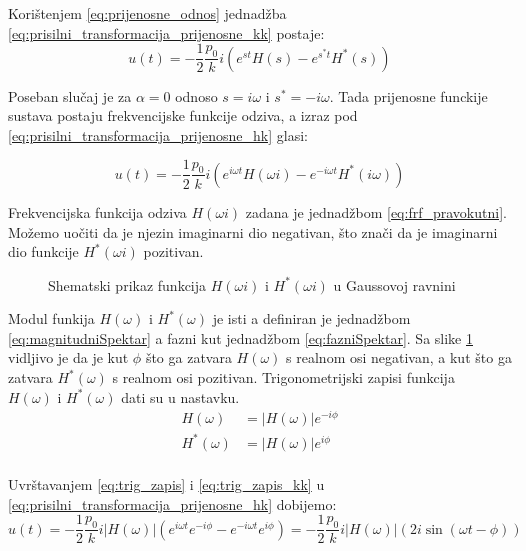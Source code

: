 Korištenjem \eqref{eq:prijenosne_odnos} jednadžba \eqref{eq:prisilni_transformacija_prijenosne_kk}
postaje:
\begin{equation}\label{eq:prisilni_transformacija_prijenosne_hk}
    u(t)=-\frac{1}{2}\frac{p_0}{k}i (e^{st}H(s)-e^{s^*t}H^*(s))
\end{equation}

Poseban slučaj je za $\alpha = 0$ odnoso $s=i\omega \text{ i } s^*=-i\omega$. Tada
prijenosne funckije sustava postaju frekvencijske funkcije odziva, a izraz pod
\eqref{eq:prisilni_transformacija_prijenosne_hk} glasi:

\begin{equation}\label{eq:prisilni_transformacija_frf}
    u(t) = -\frac{1}{2}\frac{p_0}{k}i(e^{i\omega t}H(\omega i) - e^{-i\omega t}H^*(i\omega))
\end{equation}

Frekvencijska funkcija odziva $H(\omega i)$ zadana je jednadžbom \eqref{eq:frf_pravokutni}.
Možemo uočiti da je njezin imaginarni dio negativan, što znači da je imaginarni dio
funkcije $H^*(\omega i)$ pozitivan.
\begin{figure}[H]
    
    \caption{Shematski prikaz funkcija $H(\omega i) \text{ i }H^*(\omega i)$ u
    Gaussovoj ravnini}
    \label{fig:frf-gauss}
\end{figure}

Modul funkija $H(\omega)$ i $H^*(\omega)$ je isti a definiran je jednadžbom
\eqref{eq:magnitudniSpektar} a fazni kut jednadžbom \eqref{eq:fazniSpektar}. Sa
slike \ref{fig:frf-gauss} vidljivo je da je kut $\phi$ što ga zatvara $H(\omega)$ s
realnom osi negativan, a kut što ga zatvara $H^*(\omega)$ s realnom osi pozitivan.
Trigonometrijski zapisi funkcija $H(\omega) \text{ i } H^*(\omega)$ dati su u
nastavku.
\begin{align}
    H(\omega) &= |H(\omega)|e^{-i\phi} \label{eq:trig_zapis}\\
    H^*(\omega) &= |H(\omega)|e^{i\phi} \label{eq:trik_zapis_hk}\\ %
\end{align}

Uvrštavanjem \eqref{eq:trig_zapis} i \eqref{eq:trig_zapis_kk} u \eqref{eq:prisilni_transformacija_prijenosne_hk}
dobijemo:
\begin{equation}
    u(t)=-\frac{1}{2}\frac{p_0}{k}i|H(\omega)|(e^{i\omega t}e^{-i\phi}-e^{-i\omega t}e^{i\phi})
        =-\frac{1}{2}\frac{p_0}{k}i|H(\omega)|(2i\sin(\omega t -\phi))
\end{equation}


